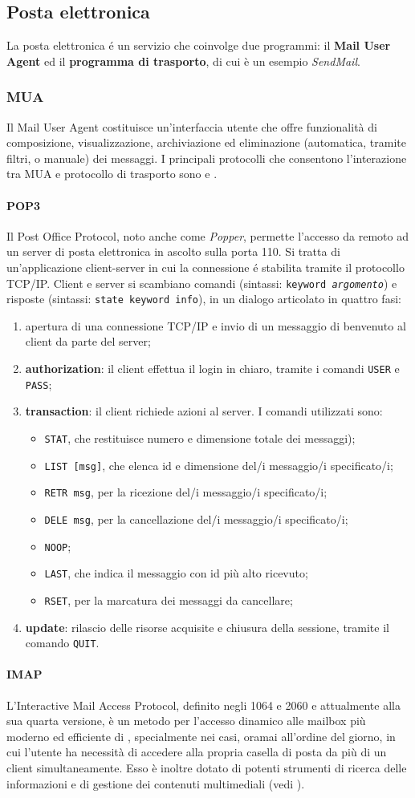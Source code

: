 \documentclass[a4paper,11pt]{article}
\def\code#1{\texttt{#1}}
\def\sub#1{\subsection{#1}\label{#1}}
\def\subsub#1{\subsubsection{#1}\label{#1}}
\def\para#1{\paragraph{#1}\label{#1}}
\def\vedi#1{\nameref{#1}}
\begin{document}
\sub {Posta elettronica}
La posta elettronica \'e un servizio che coinvolge due programmi: il \textbf{Mail User Agent} ed il \textbf{programma di trasporto}, di cui è un esempio \textit{SendMail}. 
\subsub{MUA} Il Mail User Agent costituisce un'interfaccia utente che offre funzionalità di composizione, visualizzazione, archiviazione ed eliminazione (automatica, tramite filtri, o manuale) dei messaggi.
I principali protocolli che consentono l'interazione tra MUA e protocollo di trasporto sono \vedi{POP3} e \vedi{IMAP}. 
\para{POP3}
Il Post Office Protocol, noto anche come \textit{Popper}, permette l'accesso da remoto ad un server di posta elettronica in ascolto sulla porta 110.
Si tratta di un'applicazione client-server in cui la connessione \'e stabilita tramite il protocollo TCP/IP. Client e server si scambiano comandi (sintassi: \code{keyword \textit{argomento}}) e risposte (sintassi: \code{state keyword info}), in un dialogo articolato in quattro fasi:
\begin{enumerate}
\item apertura di una connessione TCP/IP e invio di un messaggio di benvenuto al client da parte del server;
\item \textbf{authorization}: il client effettua il login in chiaro, tramite i comandi \code{USER} e \code{PASS};
\item \textbf{transaction}: il client richiede azioni al server. I comandi utilizzati sono:
\begin{itemize}
\item \code{STAT}, che restituisce numero e dimensione totale dei messaggi);
\item \code{LIST [msg]}, che elenca id e dimensione del/i messaggio/i specificato/i;
\item \code{RETR msg}, per la ricezione del/i messaggio/i specificato/i;
\item \code{DELE msg}, per la cancellazione del/i messaggio/i specificato/i;
\item \code{NOOP};
\item \code{LAST}, che indica il messaggio con id più alto ricevuto;
\item \code{RSET}, per la marcatura dei messaggi da cancellare;
\end{itemize}
\item \textbf{update}: rilascio delle risorse acquisite e chiusura della sessione, tramite il comando \code{QUIT}.
\end{enumerate}
\para{IMAP}
L'Interactive Mail Access Protocol, definito negli \vedi{RFC} 1064 e 2060 e attualmente alla sua quarta versione, è un metodo per l'accesso dinamico alle mailbox più moderno ed efficiente di \vedi{POP3}, specialmente nei casi, oramai all'ordine del giorno, in cui l'utente ha necessità di accedere alla propria casella di posta da più di un client simultaneamente. Esso è inoltre dotato di potenti strumenti di ricerca delle informazioni e di gestione dei contenuti multimediali (vedi \vedi{MIME}). 
\end{document}
